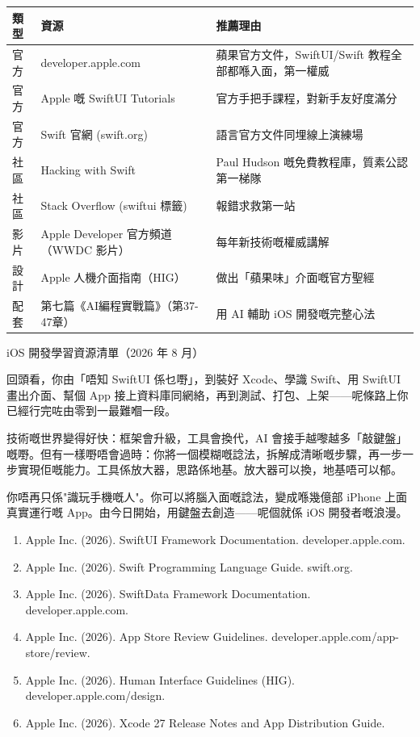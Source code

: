 \begin{center}
\begin{tabularx}{\linewidth}{|X|X|X|}
\hline
\textbf{類型} & \textbf{資源} & \textbf{推薦理由} \tabularnewline
\hline
官方 & developer.apple.com & 蘋果官方文件，SwiftUI/Swift 教程全部都喺入面，第一權威 \tabularnewline
官方 & Apple 嘅 SwiftUI Tutorials & 官方手把手課程，對新手友好度滿分 \tabularnewline
官方 & Swift 官網 (swift.org) & 語言官方文件同埋線上演練場 \tabularnewline
社區 & Hacking with Swift & Paul Hudson 嘅免費教程庫，質素公認第一梯隊 \tabularnewline
社區 & Stack Overflow (swiftui 標籤) & 報錯求救第一站 \tabularnewline
影片 & Apple Developer 官方頻道（WWDC 影片） & 每年新技術嘅權威講解 \tabularnewline
設計 & Apple 人機介面指南（HIG） & 做出「蘋果味」介面嘅官方聖經 \tabularnewline
配套 & 第七篇《AI編程實戰篇》（第37-47章） & 用 AI 輔助 iOS 開發嘅完整心法 \tabularnewline
\hline
\end{tabularx}
\end{center}

\begin{center}\small\color{gray}iOS 開發學習資源清單（2026 年 8 月）\end{center}


回頭看，你由「唔知 SwiftUI 係乜嘢」，到裝好 Xcode、學識 Swift、用 SwiftUI 畫出介面、幫個 App 接上資料庫同網絡，再到測試、打包、上架——呢條路上你已經行完咗由零到一最難嗰一段。

技術嘅世界變得好快：框架會升級，工具會換代，AI 會接手越嚟越多「敲鍵盤」嘅嘢。但有一樣嘢唔會過時：你將一個模糊嘅諗法，拆解成清晰嘅步驟，再一步一步實現佢嘅能力。工具係放大器，思路係地基。放大器可以換，地基唔可以郁。

你唔再只係"識玩手機嘅人"。你可以將腦入面嘅諗法，變成喺幾億部 iPhone 上面真實運行嘅 App。由今日開始，用鍵盤去創造——呢個就係 iOS 開發者嘅浪漫。


\begin{enumerate}
  \item Apple Inc. (2026). SwiftUI Framework Documentation. developer.apple.com.
  \item Apple Inc. (2026). Swift Programming Language Guide. swift.org.
  \item Apple Inc. (2026). SwiftData Framework Documentation. developer.apple.com.
  \item Apple Inc. (2026). App Store Review Guidelines. developer.apple.com/app-store/review.
  \item Apple Inc. (2026). Human Interface Guidelines (HIG). developer.apple.com/design.
  \item Apple Inc. (2026). Xcode 27 Release Notes and App Distribution Guide.
\end{enumerate}
